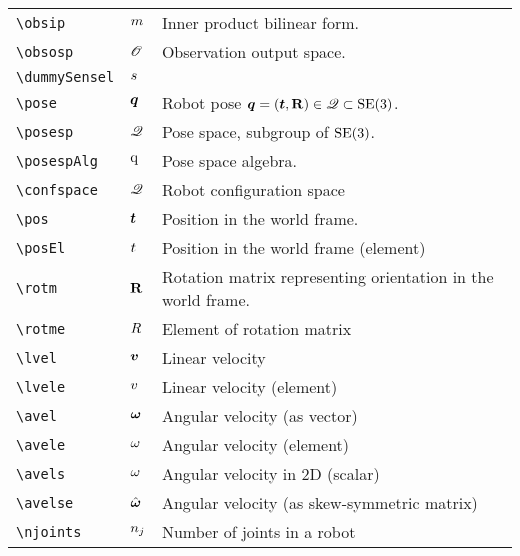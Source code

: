 \begin{longtable}{lll}
{\color[rgb]{0.5,0.5,0.5}\texttt{\textbackslash obsip}} & $m$ &  Inner product bilinear form.\\ 
 {\color[rgb]{0.5,0.5,0.5}\texttt{\textbackslash obsosp}} & $\mathscr{O}$ &  Observation output space.\\ 
 {\color[rgb]{0.5,0.5,0.5}\texttt{\textbackslash dummySensel}} & $s$ & \\ 
 {\color[rgb]{0.5,0.5,0.5}\texttt{\textbackslash pose}} & $\boldsymbol{q}$ &  Robot pose $\boldsymbol{q} = (\boldsymbol{t}, \mathbf{R}) \in \mathscr{Q} \subset \mathrm{SE(3)}$.\\ 
 {\color[rgb]{0.5,0.5,0.5}\texttt{\textbackslash posesp}} & $\mathscr{Q}$ &  Pose space, subgroup of $\mathrm{SE(3)}$.\\ 
 {\color[rgb]{0.5,0.5,0.5}\texttt{\textbackslash posespAlg}} & $\text{q}$ &  Pose space algebra.\\ 
 {\color[rgb]{0.5,0.5,0.5}\texttt{\textbackslash confspace}} & $\mathscr{Q}$ &  Robot configuration space\\ 
 {\color[rgb]{0.5,0.5,0.5}\texttt{\textbackslash pos}} & $\boldsymbol{t}$ &  Position in the world frame.\\ 
 {\color[rgb]{0.5,0.5,0.5}\texttt{\textbackslash posEl}} & $t$ &  Position in the world frame (element)\\ 
 {\color[rgb]{0.5,0.5,0.5}\texttt{\textbackslash rotm}} & $\mathbf{R}$ &  Rotation matrix representing orientation in the world frame.\\ 
 {\color[rgb]{0.5,0.5,0.5}\texttt{\textbackslash rotme}} & $R$ &  Element of rotation matrix\\ 
 {\color[rgb]{0.5,0.5,0.5}\texttt{\textbackslash lvel}} & $\boldsymbol{v}$ &  Linear velocity\\ 
 {\color[rgb]{0.5,0.5,0.5}\texttt{\textbackslash lvele}} & $v$ &  Linear velocity (element)\\ 
 {\color[rgb]{0.5,0.5,0.5}\texttt{\textbackslash avel}} & $\boldsymbol{\omega}$ &  Angular velocity (as vector)\\ 
 {\color[rgb]{0.5,0.5,0.5}\texttt{\textbackslash avele}} & $\omega$ &  Angular velocity (element)\\ 
 {\color[rgb]{0.5,0.5,0.5}\texttt{\textbackslash avels}} & $\omega$ &  Angular velocity in 2D (scalar)\\ 
 {\color[rgb]{0.5,0.5,0.5}\texttt{\textbackslash avelse}} & $\hat{\boldsymbol{\omega}}$ &  Angular velocity (as skew-symmetric matrix)\\ 
 {\color[rgb]{0.5,0.5,0.5}\texttt{\textbackslash njoints}} & $n_{j}$ &  Number of joints in a robot\\ 

\end{longtable}

